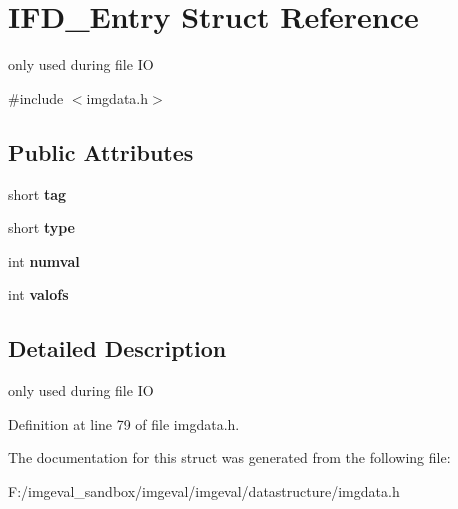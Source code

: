 \hypertarget{struct_i_f_d___entry}{
\section{IFD\_\-Entry Struct Reference}
\label{struct_i_f_d___entry}
}


only used during file IO  




{\ttfamily \#include $<$imgdata.h$>$}

\subsection*{Public Attributes}
\begin{DoxyCompactItemize}
\item 
\hypertarget{struct_i_f_d___entry_a6b7cccedbd1a3e1f89df48f33c93739f}{
short {\bfseries tag}}
\label{struct_i_f_d___entry_a6b7cccedbd1a3e1f89df48f33c93739f}

\item 
\hypertarget{struct_i_f_d___entry_a6365f9d2db644ec14fe2a5eb9b8c844d}{
short {\bfseries type}}
\label{struct_i_f_d___entry_a6365f9d2db644ec14fe2a5eb9b8c844d}

\item 
\hypertarget{struct_i_f_d___entry_aec9d9ff6d677d69a4de0be715f036a28}{
int {\bfseries numval}}
\label{struct_i_f_d___entry_aec9d9ff6d677d69a4de0be715f036a28}

\item 
\hypertarget{struct_i_f_d___entry_a063b477407a54ceac415bbcf4abcbd5b}{
int {\bfseries valofs}}
\label{struct_i_f_d___entry_a063b477407a54ceac415bbcf4abcbd5b}

\end{DoxyCompactItemize}


\subsection{Detailed Description}
only used during file IO 

Definition at line 79 of file imgdata.h.



The documentation for this struct was generated from the following file:\begin{DoxyCompactItemize}
\item 
F:/imgeval\_\-sandbox/imgeval/imgeval/datastructure/imgdata.h\end{DoxyCompactItemize}
